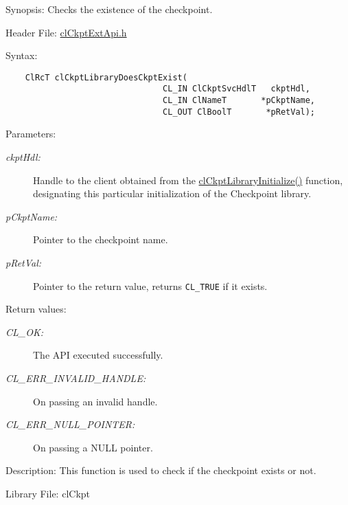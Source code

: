 \begin{Desc}
\item[Synopsis:]Checks the existence of the checkpoint.\end{Desc}
\begin{Desc}
\item[Header File:]\hyperlink{cl_ckpt_ext_api_8h}{cl\-Ckpt\-Ext\-Api.h}\end{Desc}
\begin{Desc}
\item[Syntax:]

\footnotesize\begin{verbatim}    ClRcT clCkptLibraryDoesCkptExist(
                                CL_IN ClCkptSvcHdlT   ckptHdl,
                                CL_IN ClNameT       *pCkptName,
                                CL_OUT ClBoolT       *pRetVal);
\end{verbatim}
\normalsize
\end{Desc}
\begin{Desc}
\item[Parameters:]
\begin{description}
\item[{\em ckpt\-Hdl:}]Handle to the client obtained from the \hyperlink{group__group10_ga2}{cl\-Ckpt\-Library\-Initialize()} function, designating this particular initialization of the Checkpoint library. \item[{\em p\-Ckpt\-Name:}]Pointer to the checkpoint name. \item[{\em p\-Ret\-Val:}]Pointer to the return value, returns {\tt CL\_\-TRUE} if it exists.\end{description}
\end{Desc}
\begin{Desc}
\item[Return values:]
\begin{description}
\item[{\em CL\_\-OK:}]The API executed successfully. \item[{\em CL\_\-ERR\_\-INVALID\_\-HANDLE:}]On passing an invalid handle. \item[{\em CL\_\-ERR\_\-NULL\_\-POINTER:}]On passing a NULL pointer.\end{description}
\end{Desc}
\begin{Desc}
\item[Description:]This function is used to check if the checkpoint exists or not.\end{Desc}
\begin{Desc}
\item[Library File:]cl\-Ckpt\end{Desc}
